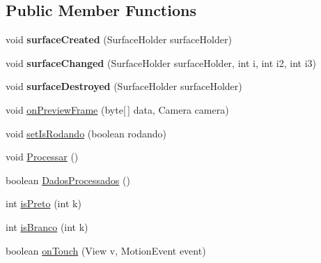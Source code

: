 \subsection*{Public Member Functions}
\begin{DoxyCompactItemize}
\item 
\hypertarget{classcom_1_1aronbordin_1_1robo_1_1camera_1_1CameraRobo_a2dcd4415d9acc0de33e6bed7cc843c6e}{void {\bfseries surface\+Created} (Surface\+Holder surface\+Holder)}\label{classcom_1_1aronbordin_1_1robo_1_1camera_1_1CameraRobo_a2dcd4415d9acc0de33e6bed7cc843c6e}

\item 
\hypertarget{classcom_1_1aronbordin_1_1robo_1_1camera_1_1CameraRobo_a88bfbd15922bb82b51cc33f0d401c602}{void {\bfseries surface\+Changed} (Surface\+Holder surface\+Holder, int i, int i2, int i3)}\label{classcom_1_1aronbordin_1_1robo_1_1camera_1_1CameraRobo_a88bfbd15922bb82b51cc33f0d401c602}

\item 
\hypertarget{classcom_1_1aronbordin_1_1robo_1_1camera_1_1CameraRobo_afd381329a45a7ee2ad06e47d0b917e3c}{void {\bfseries surface\+Destroyed} (Surface\+Holder surface\+Holder)}\label{classcom_1_1aronbordin_1_1robo_1_1camera_1_1CameraRobo_afd381329a45a7ee2ad06e47d0b917e3c}

\item 
void \hyperlink{classcom_1_1aronbordin_1_1robo_1_1camera_1_1CameraRobo_a0ccae659a8cdca149c700c82480a69dd}{on\+Preview\+Frame} (byte\mbox{[}$\,$\mbox{]} data, Camera camera)
\item 
void \hyperlink{classcom_1_1aronbordin_1_1robo_1_1camera_1_1CameraRobo_a90875b856ac94bf73ca48e46d2216c21}{set\+Is\+Rodando} (boolean rodando)
\item 
void \hyperlink{classcom_1_1aronbordin_1_1robo_1_1camera_1_1CameraRobo_adf16c2b85ed6dd6e9e486d3592547e86}{Processar} ()
\item 
boolean \hyperlink{classcom_1_1aronbordin_1_1robo_1_1camera_1_1CameraRobo_a84604cfcd672cac7046b0eb9e4fccf1b}{Dados\+Processados} ()
\item 
int \hyperlink{classcom_1_1aronbordin_1_1robo_1_1camera_1_1CameraRobo_aa4a9a1f4266f8706f7ce0f7db77fa1ad}{is\+Preto} (int k)
\item 
int \hyperlink{classcom_1_1aronbordin_1_1robo_1_1camera_1_1CameraRobo_ac34a9602b2ee4d84d1b3deb016b932ef}{is\+Branco} (int k)
\item 
boolean \hyperlink{classcom_1_1aronbordin_1_1robo_1_1camera_1_1CameraRobo_a290f5d43c351368627e558213a873fb3}{on\+Touch} (View v, Motion\+Event event)
\end{DoxyCompactItemize}
